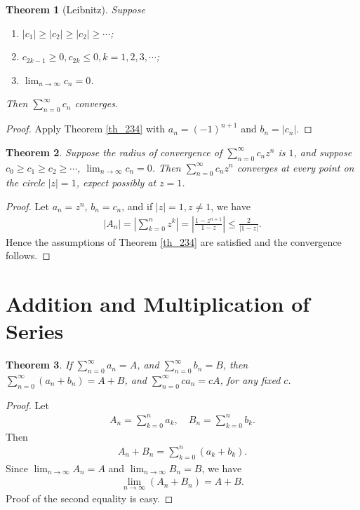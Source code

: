 \documentclass[10pt]{book}
\newtheorem{theorem}{Theorem}[chapter]
\theoremstyle{definition}
\numberwithin{equation}{chapter}
\begin{document}
\medskip

\begin{theorem}[Leibnitz]
Suppose
\begin{enumerate}[label=(\alph*)]
    \item $\left|c_1\right| \geq \left|c_2\right| \geq \left|c_2\right| \geq \cdots$;
    
    \item $c_{2k-1} \geq 0, c_{2k} \leq 0, k = 1,2,3,\cdots$;
    
    \item $\lim_{n\to\infty} c_n = 0$.
\end{enumerate}
Then $\sum^\infty_{n=0} c_n$ converges.
\end{theorem}
\begin{proof}
Apply Theorem \ref{th_234} with $a_n = (-1)^{n+1}$ and $b_n = \left|c_n\right|$.
\end{proof}

\medskip

\begin{theorem}
Suppose the radius of convergence of $\sum^\infty_{n=0} c_n z^n$ is $1$, and suppose $c_0 \geq c_1 \geq c_2 \geq \cdots$, $\lim_{n\to\infty} c_n = 0$. Then $\sum^\infty_{n=0} c_n z^n$ converges at every point on the circle $\left|z\right| = 1$, expect possibly at $z = 1$.
\end{theorem}
\begin{proof}
Let $a_n = z^n$, $b_n = c_n$, and if $\left|z\right| = 1, z \neq 1$, we have
\begin{align*}
    \left|A_n\right| = \left|\sum^n_{k=0} z^k\right| = \left|\frac{1 - z^{n+1}}{1 - z}\right| \leq \frac{2}{\left|1 - z\right|}.
\end{align*}
Hence the assumptions of Theorem \ref{th_234} are satisfied and the convergence follows.
\end{proof}

\medskip



\section{Addition and Multiplication of Series}

\begin{theorem}
If $\sum^\infty_{n=0} a_n = A$, and $\sum^\infty_{n=0} b_n = B$, then $\sum^\infty_{n=0} (a_n + b_n) = A + B$, and $\sum^\infty_{n=0} ca_n = cA$, for any fixed $c$.
\end{theorem}
\begin{proof}
Let
\begin{align*}
    A_n = \sum^n_{k=0} a_k, \quad B_n = \sum^n_{k=0} b_k.
\end{align*}
Then
\begin{align*}
    A_n + B_n = \sum^n_{k=0} (a_k + b_k).
\end{align*}
Since $\lim_{n\to\infty} A_n = A$ and $\lim_{n\to\infty} B_n = B$, we have 
\begin{align*}
    \lim_{n\to\infty}(A_n + B_n) = A + B.
\end{align*}
Proof of the second equality is easy.
\end{proof}
\end{document}
